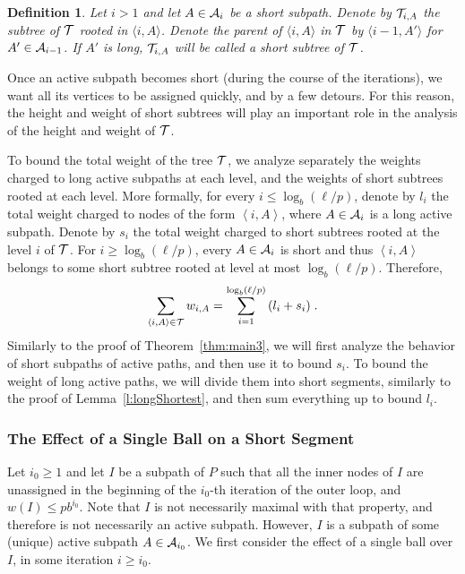\documentclass[twoside,leqno,twocolumn]{article}
\newtheorem{definition}[Definition]{Definition}
\newtheorem{definition}[theorem]{Definition}
\begin{document}
\begin{definition}
Let $i>1$ and let $A \in {\cal A}_i$ be a short subpath. Denote by ${\cal T}_{i,A}$ the subtree of ${\cal T}$ rooted in $\langle i,A \rangle$. 
Denote the parent of $\langle i,A \rangle$ in ${\cal T}$ 
by $\langle i-1,A' \rangle$ for $A' \in {\cal A}_{i-1}$.
If $A'$ is long, ${\cal T}_{i,A}$ will be called a {\em short subtree} of ${\cal T}$.
\end{definition}

Once an active subpath becomes short (during the course of the iterations), 
we want all its vertices to be assigned quickly, and by a few detours. 
For this reason, the height and weight of short subtrees will play an important role in the analysis of the height and weight of ${\cal T}$.

To bound the total weight of the tree ${\cal T}$, we analyze separately 
the weights charged to long active subpaths at each level, 
and the weights of short subtrees rooted at each level.
More formally, for every $i \le \log_b(\ell/p)$, denote by $l_i$ the total weight charged to nodes of the form $\left\langle i,A \right\rangle$, where $A \in {\cal A}_i$ is a long active subpath. Denote by $s_i$ the total weight charged to short subtrees rooted at the level $i$ of ${\cal T}$. 
For $i \ge \log_b(\ell/p)$, every $A \in {\cal A}_i$ is short and thus $\left\langle i,A \right\rangle$ belongs to some short subtree rooted at level at most $\log_b (\ell/p)$. Therefore,
\begin{equation}
\sum_{\langle i,A \rangle \in {\cal T}}{w_{i,A}} = \sum_{i=1}^{\log_b (\ell/p)}{(l_i+s_i)} \;.
\label{eq:treeWeight}
\end{equation}
Similarly to the proof of Theorem~\ref{thm:main3}, we will first analyze the behavior of short subpaths of active paths, and then use it to bound $s_i$. 
To bound the weight of long active paths, we will divide them into short segments, similarly to the proof of Lemma~\ref{l:longShortest}, and then sum everything up to bound $l_i$.


\subsubsection{The Effect of a Single Ball on a Short Segment}
Let $i_0 \ge 1$ and let $I$ be a subpath of $P$ such that all the inner nodes of $I$ are unassigned in the beginning of the $i_0$-th iteration of the outer loop, and $w(I) \le pb^{i_0}$. Note that $I$ is not necessarily maximal with that property, and therefore is not necessarily an active subpath. However, $I$ is a subpath of some (unique) active subpath $A \in {\cal A}_{i_0}$.
We first consider the effect of a single ball over $I$, in some iteration $i \ge i_0$. 
\end{document}
